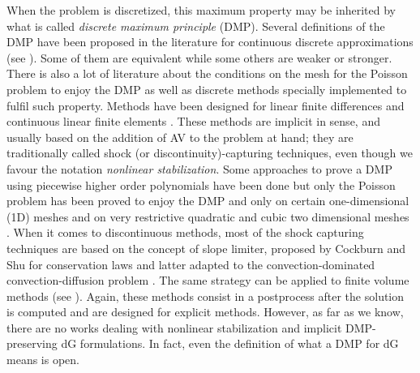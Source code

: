 When the problem is discretized, this maximum property may be inherited by what is called \textit{discrete maximum principle} (DMP). Several definitions of the DMP have been proposed in the literature for continuous discrete approximations (see \cite{codina_discontinuity-capturing_1993,hohn_remarks_1981,varga_discrete_1966,burman_edge_2004,roos_robust_2008}). Some of them are equivalent while some others are weaker or stronger. There is also a lot of literature about the conditions on the mesh for the Poisson problem to enjoy the DMP \cite{hohn_remarks_1981,vejchodsky_discrete_2007,horvath_discrete_2013,payette_performance_2012} as well as discrete methods specially implemented to fulfil such property. Methods have been designed for linear finite differences \cite{ciarlet_discrete_1970} and continuous linear finite elements \cite{ciarlet_maximum_1973,codina_discontinuity-capturing_1993,mizukami_petrov-galerkin_1985,burman_discrete_2004,burman_edge_2004,burman_stabilized_2005}. {These methods are implicit in sense, and usually based on the addition of AV to the problem at hand; they are traditionally called shock (or discontinuity)-capturing techniques, even though we favour the notation \emph{nonlinear stabilization}.} 
Some approaches to prove a DMP using piecewise higher order polynomials have been done \cite{nagarajan_enforcing_2011,payette_performance_2012,kuzmin_design_2008,vejchodsky_discrete_2007,vejchodsky_higher-order_2010,yanik_discrete_1987,yanik_sufficient_1989} but only the Poisson problem has been proved to enjoy the DMP and only on certain one-dimensional (1D) meshes \cite{vejchodsky_discrete_2007} and on very restrictive quadratic and cubic two dimensional meshes \cite{lorenz_zur_1977,hohn_remarks_1981}. When it comes to discontinuous methods, most of the shock capturing techniques are based on the concept of slope limiter, proposed by Cockburn and Shu for conservation laws \cite{cockburn_rungekutta_1998,cockburn_runge-kutta_1990} and latter adapted to the convection-dominated convection-diffusion problem  \cite{cockburn_rungekutta_2001}. The same strategy can be applied to finite volume methods (see \cite{zhang_maximum-principle-satisfying_2010,zhang_maximum-principle-satisfying_2011,zhang_maximum-principle-satisfying_2012}). Again, these methods consist in a postprocess after the solution is computed and are designed for explicit methods. {However, as far as we know, there are no works dealing with nonlinear stabilization and implicit DMP-preserving dG formulations. In fact, even the definition of what a DMP for dG means is open.}

